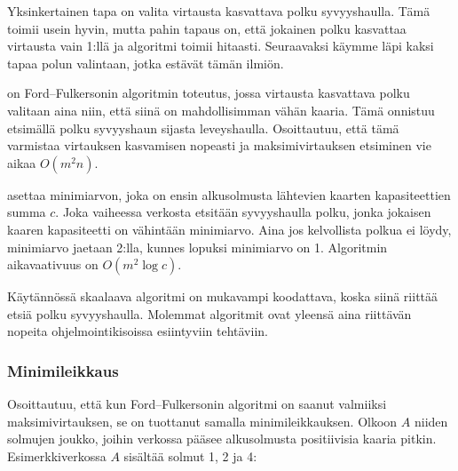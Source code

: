 Yksinkertainen tapa on valita virtausta kasvattava
polku syvyyshaulla.
Tämä toimii usein hyvin, mutta pahin tapaus on,
että jokainen polku
kasvattaa virtausta vain 1:llä ja algoritmi toimii hitaasti.
Seuraavaksi käymme läpi kaksi tapaa polun valintaan,
jotka estävät tämän ilmiön.


 on
Ford–Fulkersonin algoritmin toteutus,
jossa virtausta kasvattava polku valitaan
aina niin, että siinä on mahdollisimman vähän kaaria.
Tämä onnistuu etsimällä polku syvyyshaun
sijasta leveyshaulla.
Osoittautuu, että tämä varmistaa virtauksen
kasvamisen nopeasti ja
maksimivirtauksen etsiminen vie aikaa $O(m^2 n)$.


asettaa minimiarvon, joka on ensin alkusolmusta
lähtevien kaarten kapasiteettien summa $c$.
Joka vaiheessa verkosta etsitään
syvyyshaulla polku, jonka jokaisen kaaren kapasiteetti
on vähintään minimiarvo.
Aina jos kelvollista polkua ei löydy,
minimiarvo jaetaan 2:lla,
kunnes lopuksi minimiarvo on 1.
Algoritmin aikavaativuus on $O(m^2 \log c)$.

Käytännössä skaalaava algoritmi on mukavampi koodattava,
koska siinä riittää etsiä polku syvyyshaulla.
Molemmat algoritmit ovat yleensä aina riittävän
nopeita ohjelmointikisoissa esiintyviin tehtäviin.

\subsubsection{Minimileikkaus}


Osoittautuu, että kun Ford–Fulkersonin algoritmi on saanut valmiiksi
maksimivirtauksen, se on tuottanut samalla minimileikkauksen.
Olkoon $A$ niiden solmujen joukko,
joihin verkossa pääsee
alkusolmusta positiivisia kaaria pitkin.
Esimerkkiverkossa $A$ sisältää solmut 1, 2 ja 4:

